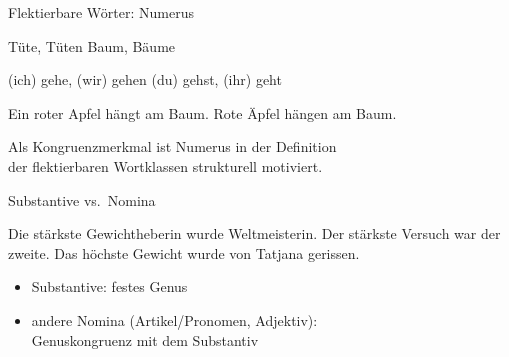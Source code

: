 \begin{frame}
  {Flektierbare Wörter: Numerus}
  \pause
  \begin{exe}
    \ex
    \begin{xlist}
      \ex Tüte, Tüten
      \pause
      \ex Baum, Bäume
    \end{xlist}
    \pause
    \ex
    \begin{xlist}
      \ex (ich) gehe, (wir) gehen
      \pause
      \ex (du) gehst, (ihr) geht
    \end{xlist}
    \Zeile
    \pause
    \ex
    \begin{xlist}
      \ex \alert<12->{Ein} \alert<13->{roter} \alert<8->{Apfel} \alert<9->{hängt} am Baum.
      \pause
      \ex \alert<14->{Rote} \alert<10->{Äpfel} \alert<11->{hängen} am Baum.
    \end{xlist}
  \end{exe}
  \Zeile
  \pause
  \pause
  \pause
  \pause
  \pause
  \pause
  \pause
  \pause
  Als \alert{Kongruenzmerkmal} ist Numerus in der Definition\\
  der flektierbaren Wortklassen \alert{strukturell motiviert}.
\end{frame}

\begin{frame}
  {Substantive vs.\ Nomina}
  \pause
  \begin{exe}
    \ex \alert<5->{Die stärkste} Gewichtheberin wurde Weltmeisterin.
    \pause
    \ex \alert<5->{Der stärkste} Versuch war der zweite.
    \pause
    \ex \alert<5->{Das höchste} Gewicht wurde von Tatjana gerissen.
  \end{exe}
  \Zeile
  \pause
  \pause
  \begin{itemize}[<+->]
    \item Substantive: festes Genus
    \item andere Nomina (Artikel\slash Pronomen, Adjektiv):\\
      \alert{Genuskongruenz mit dem Substantiv}
  \end{itemize}
\end{frame}

